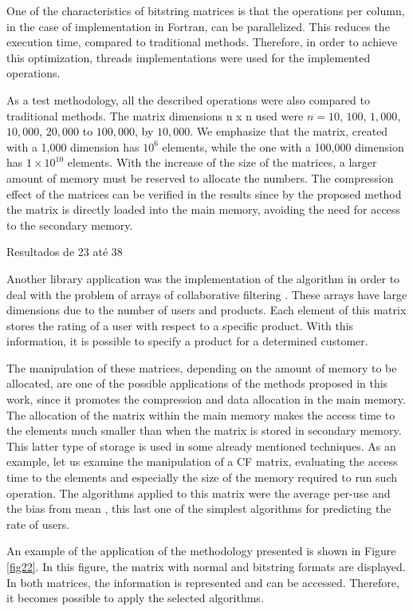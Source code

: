 \documentclass[10pt]{article}
\begin{document}
One of the characteristics of bitstring matrices is that the operations per column, in the case of implementation in 
Fortran, can be parallelized. This reduces the execution time, compared to traditional methods. Therefore, in order to 
achieve this optimization, threads implementations were used for the implemented operations.

As a test methodology, all the described operations were also compared to traditional methods. The matrix dimensions n x 
n used were $n = 10$, $100$, $1,000$, $10,000$, $20,000$ to $100,000$, by $10,000$. We emphasize that the matrix,  
created with a 1,000 dimension has $10^6$ elements, while the one with a 100,000 dimension has $1 \times 10^{10}$ 
elements. With the increase of the size of the matrices, a larger amount of memory must be reserved to allocate the 
numbers. The compression effect of the matrices can be verified in the results since by the proposed method the matrix 
is ​​directly loaded into the main memory, avoiding the need for access to the secondary memory.

Resultados de 23 até 38


Another library application was the implementation of the algorithm in order to deal with the problem of arrays of 
collaborative filtering \cite{cf}. These arrays have large dimensions due to the number of users and products. Each 
element of this matrix stores the rating of a user with respect to a specific product. With this information, it is 
possible to specify a product for a determined customer.

The manipulation of these matrices, depending on the amount of memory to be allocated, are one of the possible 
applications of the methods proposed in this work, since it promotes the compression and data allocation in the main 
memory. The allocation of the matrix within the main memory makes the access time to the elements much smaller than when 
the matrix is stored in secondary memory. This latter type of storage is used in some already mentioned techniques. As 
an example, let us examine the manipulation of a CF matrix, evaluating the access time to the elements and especially 
the size of the memory required to run such operation. The algorithms applied to this matrix were the average per-use 
and the bias from mean \cite{cf}, this last one of the simplest algorithms for predicting the rate of users.

An example of the application of the methodology presented is shown in Figure \ref{fig22}. In this figure, the matrix 
with normal and bitstring formats are displayed. In both matrices, the information is represented and can be accessed. 
Therefore, it becomes possible to apply the selected algorithms.
\end{document}

